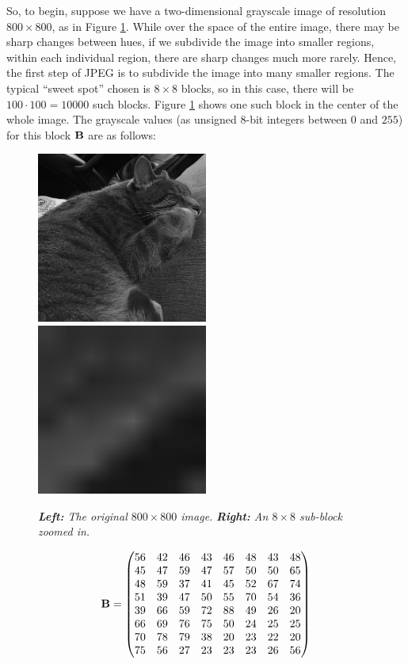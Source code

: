 So, to begin, suppose we have a two-dimensional grayscale image of resolution $800 \times 800$, as in Figure \ref{fig:charles}. While over the space of the entire image, there may be sharp changes between hues, if we subdivide the image into smaller regions, within each individual region, there are sharp changes much more rarely. Hence, the first step of JPEG is to subdivide the image into many smaller regions. The typical ``sweet spot'' chosen is $8 \times 8$ blocks, so in this case, there will be $100 \cdot 100 = 10000$ such blocks. Figure  \ref{fig:charles} shows one such block in the center of the whole image. The grayscale values (as unsigned $8$-bit integers between $0$ and $255$) for this block $\mathbf{B}$ are as follows:

\begin{figure}
	\includegraphics[width=0.5\textwidth]{chap4/figures/charles_gray.png}
	\includegraphics[width=0.5\textwidth]{chap4/figures/charles_block.png}
	\caption{{\em{\bf Left:} The original $800 \times 800$ image.} {\em{\bf Right:} An $8 \times 8$ sub-block zoomed in.}}
	\label{fig:charles}
\end{figure}

\begin{align}
	\mathbf{B} = \begin{pmatrix}
	56 & 42 &	46 &	43 &	46 & 48 &	43 &	48\\
	45 &	47 &	59 & 	47 &	57 &	50 &	50 &	65\\
	48 &	59 &	37 &	41 &	45 &	52 &	67 &	74\\
	51 &	39 &	47 &	50 &	55 &	70 &	54 &	36\\
	39 &	66 &	59 &	72 &	88 &	49 &	26 &	20\\
	66 &	69 &	76 &	75 &	50 &	24 &	25 &	25\\
	70 &	78 &	79 &	38 &	20 &	23 &	22 &	20\\
	75 &	56 &	27 &	23 &	23 &	23 &	26 &	56
	\end{pmatrix}
	\label{eq:subblock}
	\end{align}

